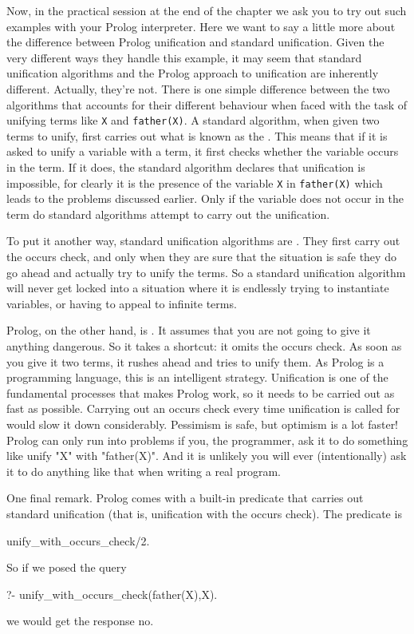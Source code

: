 Now, in the practical session at the end of the chapter we ask you to
try out such examples with your Prolog interpreter. Here we want to
say a little more about the difference between Prolog unification and
standard unification.  Given the very different ways they handle this
example, it may seem that standard unification algorithms and the
Prolog approach to unification are inherently different. Actually,
they're not. There is one simple difference between the two algorithms
that accounts for their different behaviour when faced with the task
of unifying terms like \texttt{X} and \texttt{father(X)}.  A standard
algorithm, when given two terms to unify, first carries out what is
known as the .  This means that if it is asked to
unify a variable with a term, it first checks whether the variable
occurs in the term.  If it does, the standard algorithm declares that
unification is impossible, for  clearly it is the presence of the variable
\texttt{X} in  \texttt{father(X)} which leads to the problems
discussed earlier.  Only if the variable does not occur in the term do
standard algorithms attempt to carry out the unification.


To put it another way, standard unification algorithms are
.  They first carry out the occurs check, and
only when they are sure that the situation is safe they do go ahead
and actually try to unify the terms. So a standard unification
algorithm will never get locked into a situation where it is endlessly
trying to instantiate variables, or having to appeal to infinite
terms.

Prolog, on the other hand, is . It assumes that
you are not going to give it anything dangerous.  So it takes a
shortcut: it omits the occurs check. As soon as you give it two terms,
it rushes ahead and tries to unify them.  As Prolog is a programming
language, this is an intelligent strategy.  Unification is one of the
fundamental processes that makes Prolog work, so it needs to be
carried out as fast as possible. Carrying out an occurs check every
time unification is called for would slow it down
considerably. Pessimism is safe, but optimism is a lot faster!  Prolog
can only run into problems if you, the programmer, ask it to do
something like unify "X" with "father(X)". And it is unlikely you will
ever (intentionally) ask it to do anything like that when writing a
real program.


One final remark.  Prolog comes with a built-in predicate that carries
out standard unification (that is, unification with the occurs
check). The predicate is
\begin{LPNcodedisplay}
unify_with_occurs_check/2.
\end{LPNcodedisplay}
So if we posed the query
\begin{LPNcodedisplay}
?- unify_with_occurs_check(father(X),X).
\end{LPNcodedisplay}
we would get the response  no.


